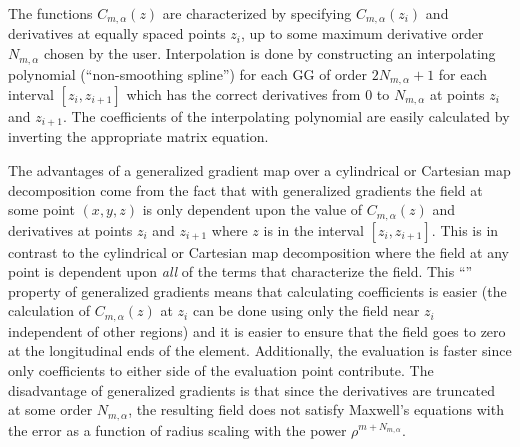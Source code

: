 The functions $C_{m,\alpha}(z)$ are characterized by specifying $C_{m,\alpha}(z_i)$ and derivatives
at equally spaced points $z_i$, up to some maximum derivative order $N_{m,\alpha}$ chosen by the
user. Interpolation is done by constructing an interpolating polynomial (``non-smoothing spline'')
for each GG of order $2N_{m,\alpha}+1$ for each
interval $[z_i, z_{i+1}]$ which has the correct derivatives from $0$ to $N_{m,\alpha}$ at points $z_i$ and
$z_{i+1}$. The coefficients of the interpolating polynomial are easily calculated by inverting the
appropriate matrix equation.

The advantages of a generalized gradient map over a cylindrical or Cartesian map decomposition come
from the fact that with generalized gradients the field at some point $(x,y,z)$ is only dependent
upon the value of $C_{m,\alpha}(z)$ and derivatives at points $z_i$ and $z_{i+1}$ where $z$ is in
the interval $[z_i, z_{i+1}]$. This is in contrast to the cylindrical or Cartesian map decomposition
where the field at any point is dependent upon {\em all} of the terms that characterize the
field. This ``'' property of generalized gradients means that calculating coefficients
is easier (the calculation of $C_{m,\alpha}(z)$ at $z_i$ can be done using only the field near $z_i$
independent of other regions) and it is easier to ensure that the field goes to zero at the
longitudinal ends of the element. Additionally, the evaluation is faster since only coefficients to
either side of the evaluation point contribute. The disadvantage of generalized gradients is that
since the derivatives are truncated at some order $N_{m,\alpha}$, the resulting field does not satisfy
Maxwell's equations with the error as a function of radius scaling with the power $\rho^{m+N_{m,\alpha}}$.

